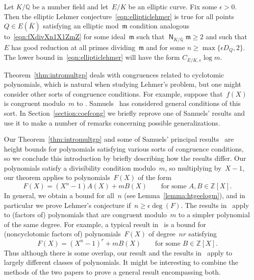 \begin{theorem}
\label{thm:mainthmintro}
Let $K/{\mathbb{Q}}$ be a number field and let~$E/K$ be an elliptic curve.  Fix
some ${\epsilon}>0$.  Then the elliptic Lehmer
conjecture~\eqref{eqn:ellipticlehmer} is true for all points~$Q\in
E({{\bar K}})$ satisfying an elliptic mod~${{\mathfrak{m}}}$ condition analogous
to~\eqref{eqn:fXdivXn1X1ZmZ} for some ideal~${{\mathfrak{m}}}$ such that
${{\operatorname{\mathsf{N}}}}_{K/{\mathbb{Q}}}{{\mathfrak{m}}}\ge2$ and such that~$E$ has good reduction at all
primes dividing~${{\mathfrak{m}}}$ and for some $n\ge\max\{{\epsilon}{D_Q},2\}$.  The
lower bound in~\eqref{eqn:ellipticlehmer} will have the form
$C_{E/K,{\epsilon}}\log m$.
\end{theorem}

Theorem~\ref{thm:intromultgp} deals with congruences related to
cyclotomic polynomials, which is natural when studying Lehmer's
problem, but one might consider other sorts of congruence
conditions. For example, suppose that~$f(X)$ is congruent modulo~$m$
to .  Samuels~\cite{MR2313990} has
considered general conditions of this sort. In
Section~\ref{section:coefcong} we briefly reprove one of Samuels'
results and use it to make a number of remarks concerning possible
generalizations. 

\begin{remark}
Our Theorem~\ref{thm:intromultgp} and some of Samuels' principal
results~\cite{MR2313990} are height bounds for polynomials satisfying
various sorts of congruence conditions, so we conclude this
introduction by briefly describing how the results differ. Our
polynomials satisfy a divisibility condition modulo~$m$, so
multiplying by~$X-1$, our theorem applies to polynomials~$F(X)$ of the
form
\[
  F(X) = (X^n-1)A(X) + mB(X)\qquad\text{for some $A,B\in{\mathbb{Z}}[X]$.}
\]
In general, we obtain a bound for all~$n$ (see
Lemma~\ref{lemma:htgeelogm}), and in particular we prove Lehmer's
conjecture if~$n\ge{\epsilon}\deg(F)$. The results in~\cite{MR2313990} apply
to (factors of) polynomials that are congruent modulo~$m$ to a simpler
polynomial of the same degree. For example, a typical result
in~\cite{MR2313990} is a bound for (noncyclotomic factors of)
polynomials~$F(X)$ of degree~$nr$ satisfying
\[
  F(X) = (X^n-1)^r + mB(X)\qquad\text{for some $B\in{\mathbb{Z}}[X]$.}
\]
Thus although there is some overlap, our result and the results
in~\cite{MR2313990} apply to largely different classes of polynomials.
It might be interesting to combine the methods of the two papers to
prove a general result encompassing both.
\end{remark}

